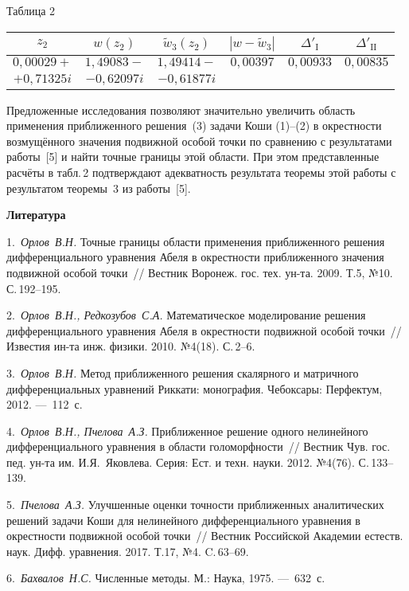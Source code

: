 \begin{table}[tb]
\footnotesize

{\raggedleft Таблица 2

}

\smallskip

{\tabcolsep=2.1mm


\bigskip

\begin{tabular}{|c|c|c|c|c|c|}
\hline
 $z_{2}$&$w(z_{2})$&$\tilde w_{3}(z_{2})$&$|w-\tilde w_{3}|$&$\Delta'_{\mathrm{I}}$&$\Delta'_{\mathrm{II}}$\\
\hline
 $0,00029+$&$1,49083-$&$1,49414-$&$0,00397$&$0,00933$&$0,00835$\\
 $+0,71325i$&$-0,62097i$&$-0,61877i$&&&\\
\hline
\end{tabular}

}
\end{table}

Предложенные исследования позволяют значительно увеличить область применения приближенного решения~(3) задачи
Коши (1)--(2) в окрестности возмущённого значения подвижной особой точки по сравнению с результатами
работы~[5] и найти точные границы этой области. При этом представленные расчёты в табл.\,2 подтверждают
адекватность результата теоремы этой работы с результатом теоремы~3 из работы~[5].

\smallskip
\centerline{\bf Литература}\nopagebreak

1.~{\it Орлов~В.Н.} Точные границы области применения приближенного решения дифференциального уравнения Абеля
в окрестности приближенного значения подвижной особой точки~// Вестник Воронеж. гос. тех. ун-та. 2009. Т.5,
№10. С.\,192--195.

2.~{\it Орлов~В.Н., Редкозубов~С.А.} Математическое моделирование решения дифференциального уравнения Абеля в
окрестности подвижной особой точки~// Известия ин-та инж. физики. 2010. №4(18). С.\,2--6.

3.~{\it Орлов~В.Н.} Метод приближенного решения скалярного и матричного дифференциальных уравнений Риккати:
монография. Чебоксары: Перфектум, 2012. ---~112~с.

4.~{\it Орлов~В.Н., Пчелова~А.З.} Приближенное решение одного нелинейного дифференциального уравнения в
области голоморфности~// Вестник Чув. гос. пед. ун-та им. И.Я.~Яковлева. Серия: Ест. и техн. науки. 2012.
№4(76). С.\,133--139.

5.~{\it Пчелова~А.З.} Улучшенные оценки точности приближенных аналитических решений задачи Коши для
нелинейного дифференциального уравнения в окрестности подвижной особой точки~// Вестник Российской Академии
естеств. наук. Дифф. уравнения. 2017. Т.17, №4. C.\,63--69.

6.~{\it Бахвалов~Н.С.} Численные методы. М.: Наука, 1975. ---~632~с.

